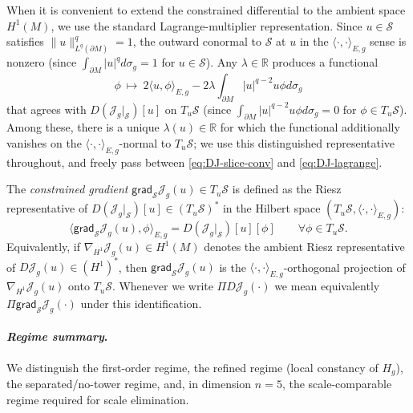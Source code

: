 \documentclass[11pt,reqno,a4paper]{amsart}
\numberwithin{equation}{section}
\theoremstyle{plain}
\theoremstyle{remark}
\theoremstyle{plain}
\begin{document}
When it is convenient to extend the constrained differential to the ambient space $H^1(M)$,
we use the standard Lagrange-multiplier representation.
Since $u\in\mathcal S$ satisfies $\|u\|_{L^q(\partial M)}^q=1$,
the outward conormal to $\mathcal S$ at $u$ in the $\langle\cdot,\cdot\rangle_{E,g}$ sense
is nonzero (since $\int_{\partial M}|u|^qd\sigma_g=1$ for $u\in\mathcal S$).
Any $\lambda\in\mathbb R$ produces a functional
\begin{equation}\label{eq:DJ-lagrange}
\phi\ \longmapsto\ 2\langle u,\phi\rangle_{E,g}-2\lambda\int_{\partial M}|u|^{q-2}u\phi d\sigma_g
\end{equation}
that agrees with $D(\mathcal J_g|_{\mathcal S})[u]$ on $T_u\mathcal S$
(since $\int_{\partial M}|u|^{q-2}u\phi d\sigma_g=0$ for $\phi\in T_u\mathcal S$).
Among these, there is a unique $\lambda(u)\in\mathbb R$ for which the functional additionally
vanishes on the $\langle\cdot,\cdot\rangle_{E,g}$-normal to $T_u\mathcal S$;
we use this distinguished representative throughout, and freely pass between
\eqref{eq:DJ-slice-conv} and \eqref{eq:DJ-lagrange}.

The \emph{constrained gradient} $\mathsf{grad}_{\mathcal S}\mathcal J_g(u)\in T_u\mathcal S$
is defined as the Riesz representative of
$D(\mathcal J_g|_{\mathcal S})[u]\in(T_u\mathcal S)^\ast$
in the Hilbert space $(T_u\mathcal S,\langle\cdot,\cdot\rangle_{E,g})$:
\[
\langle \mathsf{grad}_{\mathcal S}\mathcal J_g(u),\phi\rangle_{E,g}
=D(\mathcal J_g|_{\mathcal S})[u][\phi]
\qquad\forall\phi\in T_u\mathcal S.
\]
Equivalently, if $\nabla_{H^1}\mathcal J_g(u)\in H^1(M)$ denotes the
ambient Riesz representative of $D\mathcal J_g(u)\in(H^1)^\ast$,
then $\mathsf{grad}_{\mathcal S}\mathcal J_g(u)$
is the $\langle\cdot,\cdot\rangle_{E,g}$-orthogonal projection of
$\nabla_{H^1}\mathcal J_g(u)$ onto $T_u\mathcal S$.
Whenever we write $\Pi D\mathcal J_g(\cdot)$ we mean equivalently $\Pi\mathsf{grad}_{\mathcal S}\mathcal J_g(\cdot)$
under this identification.


\paragraph{\emph{Regime summary}.}
We distinguish the first-order regime, the refined regime (local constancy of $H_g$), the separated/no-tower regime, and, in dimension $n=5$, the scale-comparable regime required for scale elimination.
\end{document}
